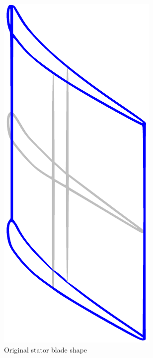 \documentclass[9pt,academicons]{article}
\begin{document}
\begin{figure}
\centering
\begin{subfigure}{.5\textwidth}
  \centering
  \includegraphics[height=.25\textheight]{img/original-blade.pdf}
  \caption{Original stator blade shape}
\end{subfigure}
\begin{subfigure}{.5\textwidth}
  \centering

\end{subfigure}
\end{figure}
\end{document}

